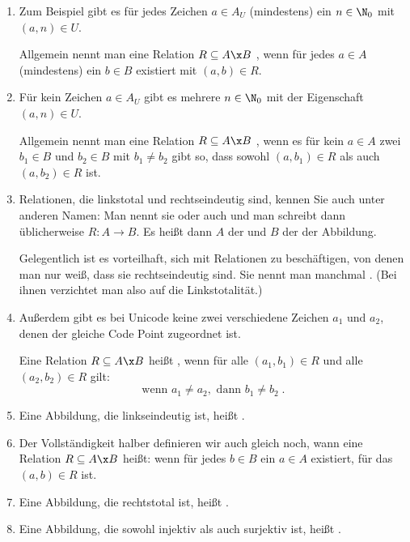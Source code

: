 \begin{enumerate}
\item Zum Beispiel gibt es für jedes Zeichen $a\in A_U$ (mindestens)
  ein $n\in\N_0$ mit $(a,n)\in U$.

  Allgemein nennt man eine Relation $R\subseteq A\x B$
  , wenn für jedes $a\in A$
  (mindestens) ein $b\in B$ existiert mit $(a,b)\in R$.
\item Für kein Zeichen $a\in A_U$ gibt es mehrere $n\in\N_0$ mit der
  Eigenschaft $(a,n)\in U$.

  Allgemein nennt man eine Relation $R\subseteq A\x B$
  , wenn es für kein $a\in
  A$ zwei $b_1\in B$ und $b_2\in B$ mit $b_1\not= b_2$ gibt so, dass
  sowohl $(a,b_1)\in R$ als auch $(a,b_2)\in R$ ist.
\item Relationen, die linkstotal und rechtseindeutig sind, kennen Sie
  auch unter anderen Namen: Man nennt sie
   oder auch
   und man schreibt dann
  üblicherweise $R:A \rightarrow B$. Es heißt dann $A$ der
   und $B$ der
   der Abbildung.

  Gelegentlich ist es vorteilhaft, sich mit Relationen zu
  beschäftigen, von denen man nur weiß, dass sie rechtseindeutig
  sind. Sie nennt man manchmal . (Bei
  ihnen verzichtet man also auf die Linkstotalität.)
\item Außerdem gibt es bei Unicode keine zwei verschiedene Zeichen
  $a_1$ und $a_2$, denen der gleiche Code Point zugeordnet ist.

  Eine Relation $R\subseteq A\x B$ heißt
  , wenn für alle $(a_1,b_1)
  \in R$ und alle $(a_2,b_2) \in R$ gilt:
  \[
  \text{wenn } a_1\not= a_2, \text{ dann }  b_1\not=b_2 \;.
  \]
\item Eine Abbildung, die linkseindeutig ist, heißt
  .
\item Der Vollständigkeit halber definieren wir auch gleich noch, wann
  eine Relation $R\subseteq A\x B$
   heißt: wenn für jedes $b\in
  B$ ein $a\in A$ existiert, für das $(a,b)\in R$ ist.
\item Eine Abbildung, die rechtstotal ist, heißt
  .
\item Eine Abbildung, die sowohl injektiv als auch surjektiv ist,
  heißt .
\end{enumerate}


